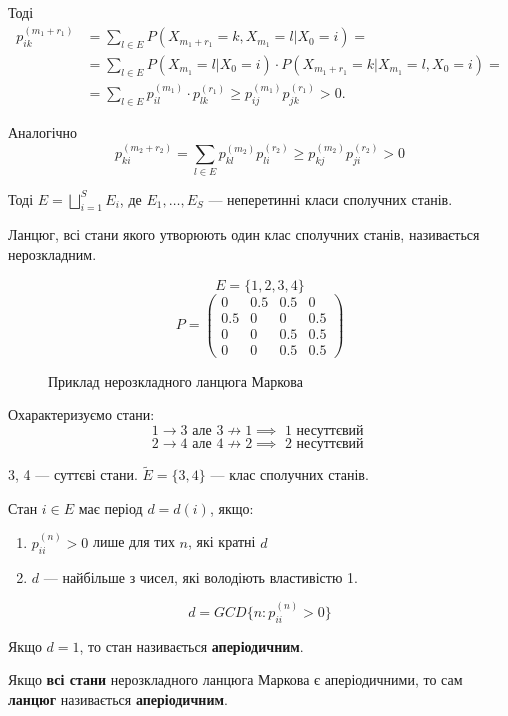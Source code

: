 Тоді
\[  \] 
\begin{align*}
  p^{(m_1 + r_1)}_{ik} &= \sum_{l \in  E}^{} P\left( X_{m_1 + r_1} = k, X_{m_1} = l | X_0 = i \right) = \\
  &= \sum_{l \in  E}^{} P\left( X_{m_1} = l | X_0 = i \right) \cdot 
  P\left( X_{m_1 + r_1} = k | X_{m_1} = l, X_0 = i \right) = \\
  &= \sum_{l \in E}^{} p^{(m_1)}_{il} \cdot p^{(r_1)}_{lk} 
  \geq p^{(m_1)}_{ij} p^{(r_1)}_{jk} > 0
.\end{align*}

Аналогічно
\[ p^{(m_2 + r_2)}_{ki} = \sum_{l \in E}^{} p^{(m_2)}_{kl}p^{(r_2)}_{li} 
\geq p^{(m_2)}_{kj} p^{(r_2)}_{ji} > 0 \] 

Тоді $E = \bigsqcup\limits^{S}_{i=1} E_i $, де $E_1, \ldots, E_S$ --- неперетинні
класи сполучних станів.

\begin{definition}
  Ланцюг, всі стани якого утворюють один клас сполучних станів,
  називається нерозкладним.
\end{definition}

\begin{example}
  \[ E = \{1, 2, 3, 4\} \] 
  \[ P = \begin{pmatrix}
    0 & 0.5 & 0.5 & 0 \\
    0.5 & 0 & 0 & 0.5 \\
    0 & 0 & 0.5 & 0.5 \\
    0 & 0 & 0.5 & 0.5
  \end{pmatrix}  \] 

\begin{figure}[ht]
    \centering
    \caption{Приклад нерозкладного ланцюга Маркова}
    \label{fig:приклад-нерозкладного-ланцюга-маркова}
\end{figure}
\end{example}

Охарактеризуємо стани:
\[ 1 \to 3 \text{ але } 3 \not\to 1 \implies \text{ 1 несуттєвий }\] 
\[ 2 \to 4 \text{ але } 4 \not\to 2 \implies \text{ 2 несуттєвий } \] 

3, 4 --- суттєві стани. $\widetilde{E} = \{3,4\}$ --- клас сполучних станів.

\begin{definition}
  Стан $i \in  E$ має період $d = d(i)$, якщо:
  \begin{enumerate}
    \item $p^{(n)}_{ii} > 0$ лише для тих $n $, які кратні $d$
    \item  $d$ --- найбільше з чисел, які володіють властивістю 1.
  \end{enumerate}
  \[ d = GCD \{ n : p^{(n)}_{ii} > 0 \} \] 
\end{definition}

\begin{definition}
  Якщо $d = 1$, то стан називається \textbf{аперіодичним}.
\end{definition}

\begin{definition}
  Якщо \textbf{всі стани} нерозкладного ланцюга Маркова є аперіодичними, то сам
  \textbf{ланцюг} називається \textbf{аперіодичним}.
\end{definition}










